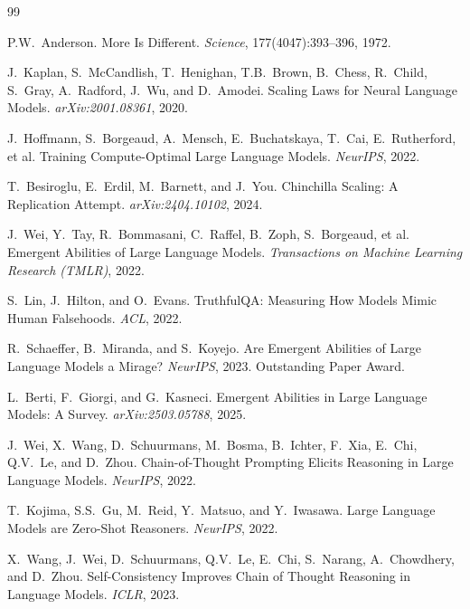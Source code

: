 \documentclass[11pt, a4paper]{article}
\theoremstyle{definition}
\theoremstyle{plain}
\begin{document}
\begin{thebibliography}{99}

P.W.~Anderson.
\newblock More Is Different.
\newblock \emph{Science}, 177(4047):393--396, 1972.

J.~Kaplan, S.~McCandlish, T.~Henighan, T.B.~Brown, B.~Chess, R.~Child,
S.~Gray, A.~Radford, J.~Wu, and D.~Amodei.
\newblock Scaling Laws for Neural Language Models.
\newblock \emph{arXiv:2001.08361}, 2020.

J.~Hoffmann, S.~Borgeaud, A.~Mensch, E.~Buchatskaya, T.~Cai, E.~Rutherford,
et al.
\newblock Training Compute-Optimal Large Language Models.
\newblock \emph{NeurIPS}, 2022.

T.~Besiroglu, E.~Erdil, M.~Barnett, and J.~You.
\newblock Chinchilla Scaling: A Replication Attempt.
\newblock \emph{arXiv:2404.10102}, 2024.

J.~Wei, Y.~Tay, R.~Bommasani, C.~Raffel, B.~Zoph, S.~Borgeaud, et al.
\newblock Emergent Abilities of Large Language Models.
\newblock \emph{Transactions on Machine Learning Research (TMLR)}, 2022.

S.~Lin, J.~Hilton, and O.~Evans.
\newblock TruthfulQA: Measuring How Models Mimic Human Falsehoods.
\newblock \emph{ACL}, 2022.

R.~Schaeffer, B.~Miranda, and S.~Koyejo.
\newblock Are Emergent Abilities of Large Language Models a Mirage?
\newblock \emph{NeurIPS}, 2023. Outstanding Paper Award.

L.~Berti, F.~Giorgi, and G.~Kasneci.
\newblock Emergent Abilities in Large Language Models: A Survey.
\newblock \emph{arXiv:2503.05788}, 2025.

J.~Wei, X.~Wang, D.~Schuurmans, M.~Bosma, B.~Ichter, F.~Xia, E.~Chi,
Q.V.~Le, and D.~Zhou.
\newblock Chain-of-Thought Prompting Elicits Reasoning in Large Language Models.
\newblock \emph{NeurIPS}, 2022.

T.~Kojima, S.S.~Gu, M.~Reid, Y.~Matsuo, and Y.~Iwasawa.
\newblock Large Language Models are Zero-Shot Reasoners.
\newblock \emph{NeurIPS}, 2022.

X.~Wang, J.~Wei, D.~Schuurmans, Q.V.~Le, E.~Chi, S.~Narang, A.~Chowdhery,
and D.~Zhou.
\newblock Self-Consistency Improves Chain of Thought Reasoning in Language
Models.
\newblock \emph{ICLR}, 2023.


\end{thebibliography}
\end{document}
